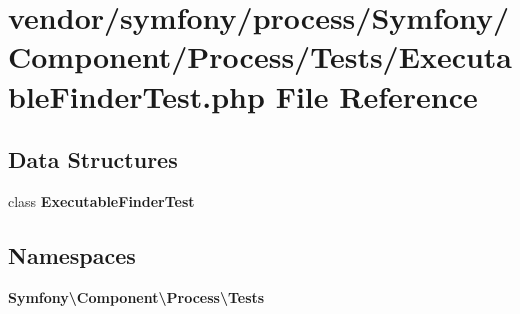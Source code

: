 \section{vendor/symfony/process/\+Symfony/\+Component/\+Process/\+Tests/\+Executable\+Finder\+Test.php File Reference}
\label{_executable_finder_test_8php}
\subsection*{Data Structures}
\begin{DoxyCompactItemize}
\item 
class {\bf Executable\+Finder\+Test}
\end{DoxyCompactItemize}
\subsection*{Namespaces}
\begin{DoxyCompactItemize}
\item 
 {\bf Symfony\textbackslash{}\+Component\textbackslash{}\+Process\textbackslash{}\+Tests}
\end{DoxyCompactItemize}

